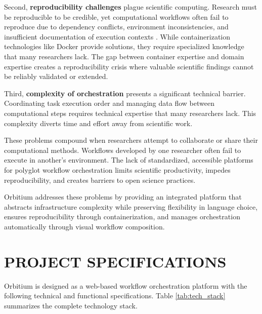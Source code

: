 \documentclass[12pt]{article}
\begin{document}
\hspace{\parindent}Second, \textbf{reproducibility challenges} plague scientific computing. Research must be reproducible to be credible, yet computational workflows often fail to reproduce due to dependency conflicts, environment inconsistencies, and insufficient documentation of execution contexts \cite{stodden2016enhancing}. While containerization technologies like Docker provide solutions, they require specialized knowledge that many researchers lack. The gap between container expertise and domain expertise creates a reproducibility crisis where valuable scientific findings cannot be reliably validated or extended.

\hspace{\parindent}Third, \textbf{complexity of orchestration} presents a significant technical barrier. Coordinating task execution order and managing data flow between computational steps requires technical expertise that many researchers lack. This complexity diverts time and effort away from scientific work.

\hspace{\parindent}These problems compound when researchers attempt to collaborate or share their computational methods. Workflows developed by one researcher often fail to execute in another's environment. The lack of standardized, accessible platforms for polyglot workflow orchestration limits scientific productivity, impedes reproducibility, and creates barriers to open science practices. 

\hspace{\parindent}Orbitium addresses these problems by providing an integrated platform that abstracts infrastructure complexity while preserving flexibility in language choice, ensures reproducibility through containerization, and manages orchestration automatically through visual workflow composition.

\newpage
\section{PROJECT SPECIFICATIONS}

\hspace{\parindent}Orbitium is designed as a web-based workflow orchestration platform with the following technical and functional specifications. Table \ref{tab:tech_stack} summarizes the complete technology stack.
\end{document}
